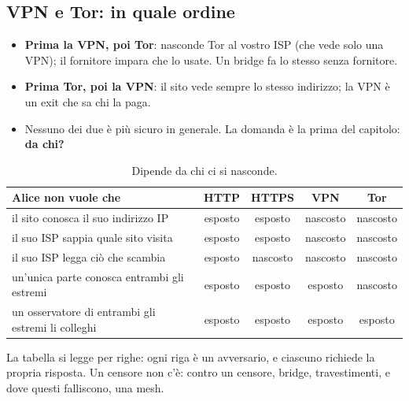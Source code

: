 \subsection{VPN e Tor: in quale ordine}

\begin{itemize}
    \item \textbf{Prima la VPN, poi Tor}: nasconde Tor al vostro ISP (che vede solo una VPN); il fornitore impara che lo usate. Un bridge fa
          lo stesso senza fornitore.
    \item \textbf{Prima Tor, poi la VPN}: il sito vede sempre lo stesso indirizzo; la VPN è un exit che sa chi la paga.
    \item Nessuno dei due è più sicuro in generale. La domanda è la prima del capitolo: \textbf{da chi?}
\end{itemize}

\begin{table}[H]
\centering
\begin{tabular}{lcccc}
\toprule
\textbf{Alice non vuole che} & \textbf{HTTP} & \textbf{HTTPS} & \textbf{VPN} & \textbf{Tor} \\
\midrule
il sito conosca il suo indirizzo IP & esposto & esposto & nascosto & nascosto \\
il suo ISP sappia quale sito visita & esposto & esposto & nascosto & nascosto \\
il suo ISP legga ciò che scambia & esposto & nascosto & nascosto & nascosto \\
un'unica parte conosca entrambi gli estremi & esposto & esposto & esposto & nascosto \\
un osservatore di entrambi gli estremi li colleghi & esposto & esposto & esposto & esposto \\
\bottomrule
\end{tabular}
\caption{Dipende da chi ci si nasconde.}
\end{table}

La tabella si legge per righe: ogni riga è un avversario, e ciascuno richiede la propria risposta. Un censore non c'è: contro un censore,
bridge, travestimenti, e dove questi falliscono, una mesh.

